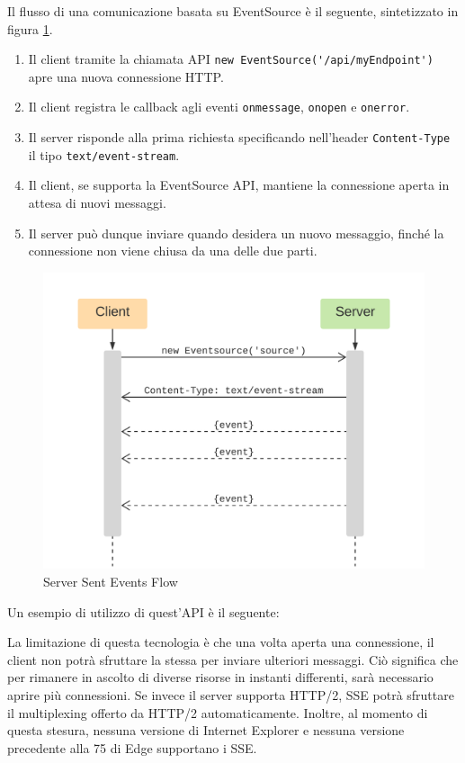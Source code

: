 \documentclass[12pt,a4paper,openright]{report}
\begin{document}
Il flusso di una comunicazione basata su EventSource è il seguente\cite{eventsource_api}, sintetizzato in figura \ref{fig:server_sent_events}.

\begin{enumerate}
  \item Il client tramite la chiamata API \lstinline{new EventSource('/api/myEndpoint')} apre una nuova connessione HTTP.
  \item Il client registra le callback agli eventi \lstinline{onmessage}, \lstinline{onopen} e \lstinline{onerror}.
  \item Il server risponde alla prima richiesta specificando nell'header \lstinline{Content-Type} il tipo \lstinline{text/event-stream}.
  \item Il client, se supporta la EventSource API, mantiene la connessione aperta in attesa di nuovi messaggi.
  \item Il server può dunque inviare quando desidera un nuovo messaggio, finché la connessione non viene chiusa da una delle due parti.
\end{enumerate}

\begin{figure}[!htbp]
\centering
\includegraphics[width=.6\textwidth]{assets/server_sent_events.png}
\caption{Server Sent Events Flow}
\label{fig:server_sent_events}
\end{figure}

Un esempio di utilizzo di quest'API è il seguente:


La limitazione di questa tecnologia è che una volta aperta una connessione, il client non potrà sfruttare la stessa per inviare ulteriori messaggi. Ciò significa che per rimanere in ascolto di diverse risorse in instanti differenti, sarà necessario aprire più connessioni. Se invece il server supporta HTTP/2, SSE potrà sfruttare il multiplexing offerto da HTTP/2 automaticamente.
Inoltre, al momento di questa stesura, nessuna versione di Internet Explorer e nessuna versione precedente alla 75 di Edge supportano i SSE\cite{sse_support_caniuse}.
\end{document}
